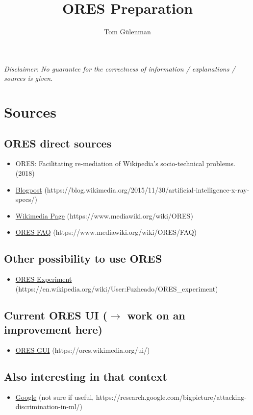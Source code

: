 \documentclass[12pt,a4paper]{article}
\title{ORES Preparation}
\author{Tom Gülenman}
\begin{document}
\maketitle
\textit{Disclaimer: No guarantee for the correctness of information / explanations / sources is given.}
\section{Sources}
\subsection{ORES direct sources}
\begin{itemize}
\item ORES: Facilitating re-mediation of Wikipedia’s socio-technical problems. 
(2018)
\item \href{https://blog.wikimedia.org/2015/11/30/artificial-intelligence-x-ray-specs/}{Blogpost} (https://blog.wikimedia.org/2015/11/30/artificial-intelligence-x-ray-specs/)
\item \href{https://www.mediawiki.org/wiki/ORES}{Wikimedia Page} (https://www.mediawiki.org/wiki/ORES)
\item \href{https://www.mediawiki.org/wiki/ORES/FAQ}{ORES FAQ} (https://www.mediawiki.org/wiki/ORES/FAQ)
\end{itemize}
\subsection{Other possibility to use ORES}
\begin{itemize}
\item \href{https://en.wikipedia.org/wiki/User:Fuzheado/ORES_experiment}{ORES Experiment} (https://en.wikipedia.org/wiki/User:Fuzheado/ORES\_experiment)
\end{itemize}
\subsection{Current ORES UI (\(\rightarrow\) work on an improvement here)}
\begin{itemize}
\item \href{https://ores.wikimedia.org/ui/}{ORES GUI} (https://ores.wikimedia.org/ui/)
\end{itemize}
\subsection{Also interesting in that context}
\begin{itemize}
\item \href{https://research.google.com/bigpicture/attacking-discrimination-in-ml/}{Google} (not sure if useful, https://research.google.com/bigpicture/attacking-discrimination-in-ml/)
\end{itemize}
\end{document}
